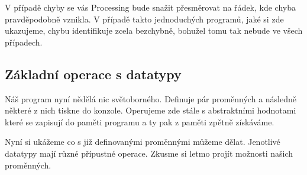 \documentclass[11pt]{article}
\begin{document}
V případě chyby se vás Processing bude snažit přesměrovat na řádek, kde chyba pravděpodobně vznikla. V případě takto jednoduchých programů, jaké si zde ukazujeme, chybu identifikuje zcela bezchybně, bohužel tomu tak nebude ve všech případech.


\subsection{Základní operace s datatypy}

Náš program nyní nědělá nic světoborného. Definuje pár proměnných a následně některé z nich tiskne do konzole. Operujeme zde stále s abstraktními hodnotami které se zapisují do paměti programu a ty pak z paměti zpětně získáváme.

Nyní si ukážeme co s již definovanými proměnnými můžeme dělat. Jenotlivé datatypy mají různé přípustné operace. Zkusme si letmo projít možnosti našich proměnných.
\end{document}

